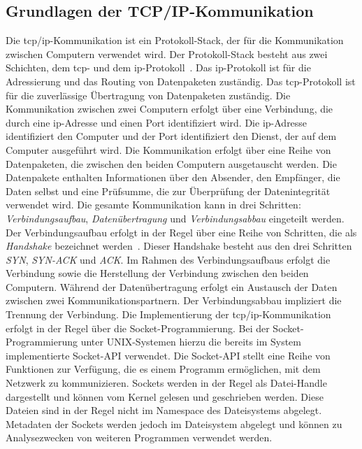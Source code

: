 
\subsection{Grundlagen der TCP/IP-Kommunikation}\label{subsec:tcp/ip-kommunikation}
Die \gls{tcp}/\gls{ip}-Kommunikation ist ein Protokoll-Stack, der für die Kommunikation zwischen Computern verwendet wird.
Der Protokoll-Stack besteht aus zwei Schichten, dem \gls{tcp}- und dem \gls{ip}-Protokoll~\cite{tcp-ip}.
Das \gls{ip}-Protokoll ist für die Adressierung und das Routing von Datenpaketen zuständig.
Das \gls{tcp}-Protokoll ist für die zuverlässige Übertragung von Datenpaketen zuständig.
Die Kommunikation zwischen zwei Computern erfolgt über eine Verbindung, die durch eine \gls{ip}-Adresse und einen Port identifiziert wird.
Die \gls{ip}-Adresse identifiziert den Computer und der Port identifiziert den Dienst, der auf dem Computer ausgeführt wird.
Die Kommunikation erfolgt über eine Reihe von Datenpaketen, die zwischen den beiden Computern ausgetauscht werden.
Die Datenpakete enthalten Informationen über den Absender, den Empfänger, die Daten selbst und eine Prüfsumme,
die zur Überprüfung der Datenintegrität verwendet wird.
Die gesamte Kommunikation kann in drei Schritten: \textit{Verbindungsaufbau}, \textit{Datenübertragung} und \textit{Verbindungsabbau}
eingeteilt werden.
Der Verbindungsaufbau erfolgt in der Regel über eine Reihe von Schritten, die als \textit{Handshake} bezeichnet werden~\cite{tcp-handshake}.
Dieser Handshake besteht aus den drei Schritten \textit{SYN}, \textit{SYN-ACK} und \textit{ACK}.
Im Rahmen des Verbindungsaufbaus erfolgt die Verbindung sowie die Herstellung der Verbindung zwischen den beiden Computern.
Während der Datenübertragung erfolgt ein Austausch der Daten zwischen zwei Kommunikationspartnern.
Der Verbindungsabbau impliziert die Trennung der Verbindung.
Die Implementierung der \gls{tcp}/\gls{ip}-Kommunikation erfolgt in der Regel über die Socket-Programmierung.
Bei der Socket-Programmierung unter UNIX-Systemen hierzu die bereits im System implementierte Socket-API verwendet.
Die Socket-API stellt eine Reihe von Funktionen zur Verfügung, die es einem Programm ermöglichen, mit dem Netzwerk zu kommunizieren.
Sockets werden in der Regel als Datei-Handle dargestellt und können vom Kernel gelesen und geschrieben werden.
Diese Dateien sind in der Regel nicht im Namespace des Dateisystems abgelegt.
Metadaten der Sockets werden jedoch im Dateisystem abgelegt und können zu Analysezwecken von weiteren Programmen verwendet werden.
